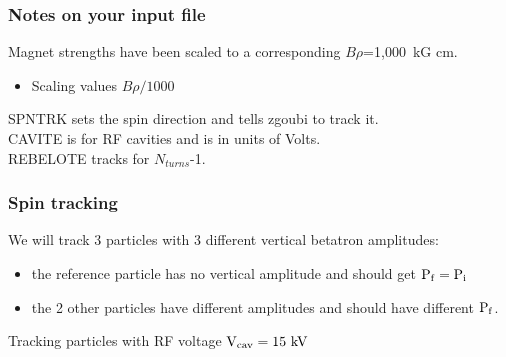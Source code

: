 \documentclass{beamer}
\begin{document}
\begin{frame}
\frametitle{Notes on your input file}
Magnet strengths have been scaled to a corresponding $B\rho$=1,000~kG cm.
\begin{itemize}
\item Scaling values $B\rho/1000$
\end{itemize}
SPNTRK sets the spin direction and tells zgoubi to track it.\\
CAVITE is for RF cavities and is in units of Volts.\\
REBELOTE tracks for $N_{turns}$-1.\\


\end{frame}

\begin{frame}
\frametitle{Spin tracking}
We will track 3 particles with 3 different vertical betatron amplitudes:
\begin{itemize}
\item the reference particle has no vertical amplitude and should get $\rm P_f=P_i$
\item the 2 other particles have different amplitudes and should have different $\rm P_f$.
\end{itemize}
Tracking particles with RF voltage $\rm V_{cav}=15~kV$\\


\end{frame}
\end{document}
